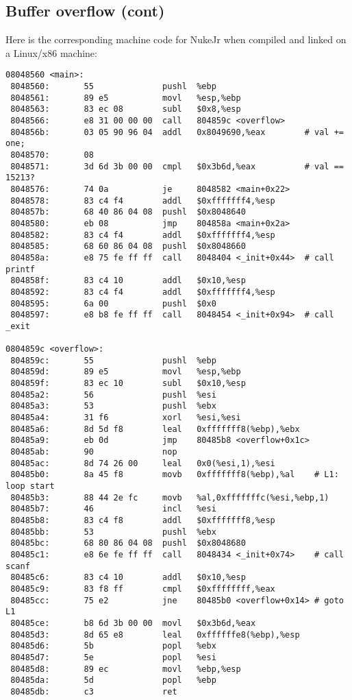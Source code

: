\subsection*{Buffer overflow (cont)}
Here is the corresponding machine code for NukeJr when 
compiled and linked on a Linux/x86 machine:
{\small
\begin{verbatim}
08048560 <main>:
 8048560:       55              pushl  %ebp
 8048561:       89 e5           movl   %esp,%ebp
 8048563:       83 ec 08        subl   $0x8,%esp
 8048566:       e8 31 00 00 00  call   804859c <overflow>
 804856b:       03 05 90 96 04  addl   0x8049690,%eax        # val += one;
 8048570:       08 
 8048571:       3d 6d 3b 00 00  cmpl   $0x3b6d,%eax          # val == 15213?
 8048576:       74 0a           je     8048582 <main+0x22> 
 8048578:       83 c4 f4        addl   $0xfffffff4,%esp
 804857b:       68 40 86 04 08  pushl  $0x8048640
 8048580:       eb 08           jmp    804858a <main+0x2a>
 8048582:       83 c4 f4        addl   $0xfffffff4,%esp
 8048585:       68 60 86 04 08  pushl  $0x8048660
 804858a:       e8 75 fe ff ff  call   8048404 <_init+0x44>  # call printf
 804858f:       83 c4 10        addl   $0x10,%esp
 8048592:       83 c4 f4        addl   $0xfffffff4,%esp
 8048595:       6a 00           pushl  $0x0
 8048597:       e8 b8 fe ff ff  call   8048454 <_init+0x94>  # call _exit

0804859c <overflow>:
 804859c:       55              pushl  %ebp
 804859d:       89 e5           movl   %esp,%ebp
 804859f:       83 ec 10        subl   $0x10,%esp
 80485a2:       56              pushl  %esi
 80485a3:       53              pushl  %ebx
 80485a4:       31 f6           xorl   %esi,%esi
 80485a6:       8d 5d f8        leal   0xfffffff8(%ebp),%ebx
 80485a9:       eb 0d           jmp    80485b8 <overflow+0x1c>
 80485ab:       90              nop    
 80485ac:       8d 74 26 00     leal   0x0(%esi,1),%esi
 80485b0:       8a 45 f8        movb   0xfffffff8(%ebp),%al    # L1: loop start
 80485b3:       88 44 2e fc     movb   %al,0xfffffffc(%esi,%ebp,1)
 80485b7:       46              incl   %esi
 80485b8:       83 c4 f8        addl   $0xfffffff8,%esp
 80485bb:       53              pushl  %ebx
 80485bc:       68 80 86 04 08  pushl  $0x8048680
 80485c1:       e8 6e fe ff ff  call   8048434 <_init+0x74>    # call scanf
 80485c6:       83 c4 10        addl   $0x10,%esp
 80485c9:       83 f8 ff        cmpl   $0xffffffff,%eax
 80485cc:       75 e2           jne    80485b0 <overflow+0x14> # goto L1
 80485ce:       b8 6d 3b 00 00  movl   $0x3b6d,%eax
 80485d3:       8d 65 e8        leal   0xffffffe8(%ebp),%esp
 80485d6:       5b              popl   %ebx
 80485d7:       5e              popl   %esi
 80485d8:       89 ec           movl   %ebp,%esp
 80485da:       5d              popl   %ebp
 80485db:       c3              ret    
\end{verbatim}}


